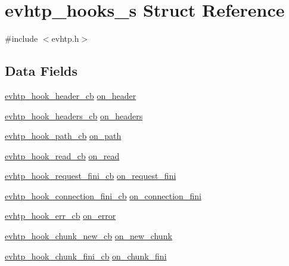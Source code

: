 \hypertarget{structevhtp__hooks__s}{
\section{evhtp\_\-hooks\_\-s Struct Reference}
\label{structevhtp__hooks__s}
}


{\ttfamily \#include $<$evhtp.h$>$}

\subsection*{Data Fields}
\begin{DoxyCompactItemize}
\item 
\hyperlink{evhtp_8h_a2cddb211091dc5b19e57188a9104c34f}{evhtp\_\-hook\_\-header\_\-cb} \hyperlink{structevhtp__hooks__s_a3062e8d2a83147219affa3c69ef3abfe}{on\_\-header}
\item 
\hyperlink{evhtp_8h_aef2db349d398a565e2408694e1e8b646}{evhtp\_\-hook\_\-headers\_\-cb} \hyperlink{structevhtp__hooks__s_a0afaaf69ca2cb4386475120fbff830f8}{on\_\-headers}
\item 
\hyperlink{evhtp_8h_ae389ed1d9a3addcaa39bc4b286e12fab}{evhtp\_\-hook\_\-path\_\-cb} \hyperlink{structevhtp__hooks__s_a955ae840d237ccd632bd47e2ffe74908}{on\_\-path}
\item 
\hyperlink{evhtp_8h_a1c1df6bb6154893dd2d7e46999ea5f2d}{evhtp\_\-hook\_\-read\_\-cb} \hyperlink{structevhtp__hooks__s_a03ab0478633f5599bd5630a3a93c4add}{on\_\-read}
\item 
\hyperlink{evhtp_8h_a8653bf424ac2974da47ceb54ed131889}{evhtp\_\-hook\_\-request\_\-fini\_\-cb} \hyperlink{structevhtp__hooks__s_a6ac6a986b72cd6ddb313d5473b24a775}{on\_\-request\_\-fini}
\item 
\hyperlink{evhtp_8h_a7305964a053bfbf2bbab00a56e87c63d}{evhtp\_\-hook\_\-connection\_\-fini\_\-cb} \hyperlink{structevhtp__hooks__s_ab5055f169a8bd03bf41956a7e4cd752d}{on\_\-connection\_\-fini}
\item 
\hyperlink{evhtp_8h_accee2d620d476bc387b20ac035bd4233}{evhtp\_\-hook\_\-err\_\-cb} \hyperlink{structevhtp__hooks__s_ae5840f4ca13d16882f8bc84b306a7d9f}{on\_\-error}
\item 
\hyperlink{evhtp_8h_a788b8f65cf9ff82171da1849feeb5750}{evhtp\_\-hook\_\-chunk\_\-new\_\-cb} \hyperlink{structevhtp__hooks__s_a16e5898ad1b546019685b4c6854a0dfb}{on\_\-new\_\-chunk}
\item 
\hyperlink{evhtp_8h_ae98ecd9989d124a1450b932a677d6c0f}{evhtp\_\-hook\_\-chunk\_\-fini\_\-cb} \hyperlink{structevhtp__hooks__s_a7905e89a5d4086104635ddc867e02fe1}{on\_\-chunk\_\-fini}

\end{DoxyCompactItemize}
